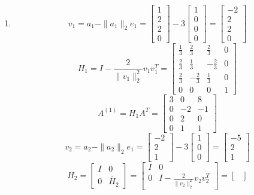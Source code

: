 \documentclass[english,onecolumn]{IEEEtran}
\begin{document}
\begin{enumerate}
	\item 
	$$v_1 = a_1-\|a_1\|_2e_1 = \begin{bmatrix} 1\\2\\2\\0\end{bmatrix} -  3\begin{bmatrix} 1\\0\\0\\0\end{bmatrix}= \begin{bmatrix} -2\\2\\2\\0\end{bmatrix}$$
	$$H_1=I-\frac{2}{\|v_1\|_2^2}v_1v_1^T=\begin{bmatrix}
    		\frac{1}{3} & \frac{2}{3} & \frac{2}{3} & 0\\
    		\frac{2}{3} & \frac{1}{3} &-\frac{2}{3} & 0\\
    		\frac{2}{3} & -\frac{2}{3} & \frac{1}{3} & 0\\
    		0 & 0 & 0 & 1
    	\end{bmatrix}$$
    $$A^{(1)}=H_1A^T = \begin{bmatrix}
    		3 & 0 & 8 \\
    		0 & -2 &-1\\
    		0 & 2 & 0\\
    		0 & 1 & 1 \end{bmatrix}$$
   	$$v_2 = a_2-\|a_2\|_2e_1 =  \begin{bmatrix} -2\\2\\1\end{bmatrix} -  3\begin{bmatrix} 1\\0\\0\end{bmatrix}= \begin{bmatrix} -5\\2\\1\end{bmatrix}$$
   	$$H_2 = \begin{bmatrix}
    		I & 0 \\
    		0 & \tilde{H_2} 
    	\end{bmatrix}=\begin{bmatrix}
    		I & 0 \\
    		0 & I-\frac{2}{\|v_2\|_2^2}v_2v_2^T \end{bmatrix}=\begin{bmatrix}

\end{bmatrix}$$
\end{enumerate}
\end{document}
